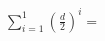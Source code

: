 \documentclass[preview]{standalone}
\begin{document}
\begin{align*}
\sum_{i=1}^1 \left(\frac{d}{2}\right)^i=
\end{align*}
\end{document}
